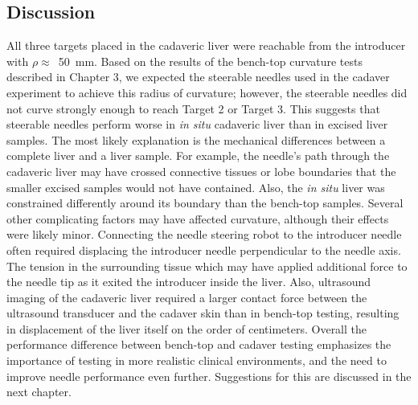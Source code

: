 \subsection{Discussion}
All three targets placed in the cadaveric liver were reachable from the introducer with $\rho \approx$~50~mm. Based on the results of the bench-top curvature tests described in Chapter 3, we expected the steerable needles used in the cadaver experiment to achieve this radius of curvature; however, the steerable needles did not curve strongly enough to reach Target 2 or Target 3. This suggests that steerable needles perform worse in \textit{in situ} cadaveric liver than in excised liver samples. The most likely explanation is the mechanical differences between a complete liver and a liver sample. For example, the needle's path through the cadaveric liver may have crossed connective tissues or lobe boundaries that the smaller excised samples would not have contained. Also, the \textit{in situ} liver was constrained differently around its boundary than the bench-top samples. Several other complicating factors may have affected curvature, although their effects were likely minor. Connecting the needle steering robot to the introducer needle often required displacing the introducer needle perpendicular to the needle axis. The tension in the surrounding tissue which may have applied additional force to the needle tip as it exited the introducer inside the liver. Also, ultrasound imaging of the cadaveric liver required a larger contact force between the ultrasound transducer and the cadaver skin than in bench-top testing, resulting in displacement of the liver itself on the order of centimeters. Overall the performance difference between bench-top and cadaver testing emphasizes the importance of testing in more realistic clinical environments, and the need to improve needle performance even further. Suggestions for this are discussed in the next chapter.

